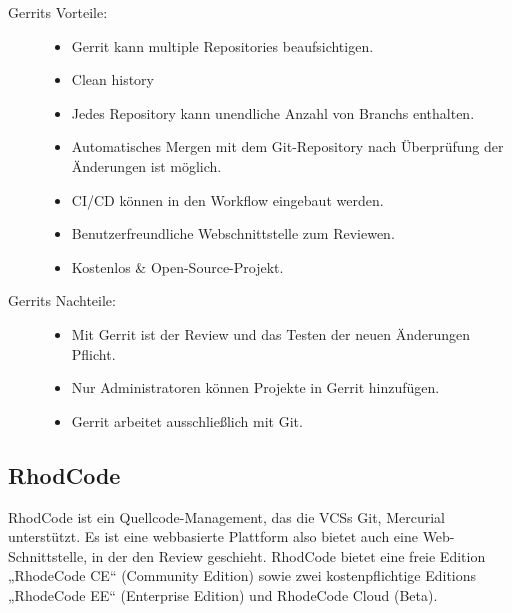 \begin{description}
	\item [Gerrits Vorteile:] \hfill
	\begin{itemize}
		\item Gerrit kann multiple Repositories beaufsichtigen.
		\item Clean history 
		\item Jedes Repository kann unendliche Anzahl von Branchs enthalten.
		\item Automatisches Mergen mit dem Git-Repository nach Überprüfung der Änderungen ist möglich.
		\item \ac{CI}/\ac{CD} können in den Workflow eingebaut werden.
		\item Benutzerfreundliche Webschnittstelle zum Reviewen.
		\item Kostenlos \& Open-Source-Projekt.
	\end{itemize}
	
	\item [Gerrits Nachteile:] \hfill
	\begin{itemize}
		\item Mit Gerrit ist der Review und das Testen der neuen Änderungen Pflicht.
		\item Nur Administratoren können Projekte in Gerrit hinzufügen.
		\item Gerrit arbeitet ausschließlich mit Git.
	\end{itemize}
\end{description}

\subsection{RhodCode}
\label{subsec:RhodeCode}

RhodCode ist ein Quellcode-Management, das die \acp{VCS} Git, Mercurial unterstützt. Es ist eine webbasierte Plattform also bietet auch eine Web-Schnittstelle, in der den Review geschieht.
RhodCode bietet eine freie Edition „RhodeCode CE“ (Community Edition) sowie zwei kostenpflichtige Editions „RhodeCode EE“ (Enterprise Edition) und RhodeCode Cloud (Beta).

